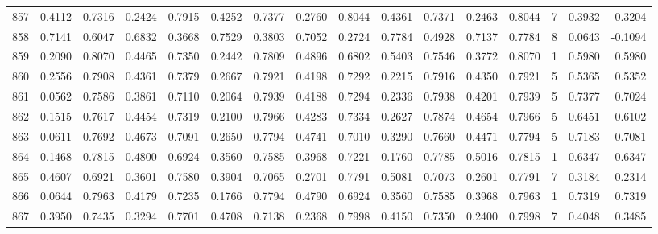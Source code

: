 \begin{tabular}{lrrrrrrrrrrrrrrr}
857 &      0.4112 &  0.7316 &  0.2424 &  0.7915 &  0.4252 &  0.7377 &  0.2760 &  0.8044 &  0.4361 &  0.7371 &   0.2463 &     0.8044 &      7 &                    0.3932 &                     0.3204 \\
858 &      0.7141 &  0.6047 &  0.6832 &  0.3668 &  0.7529 &  0.3803 &  0.7052 &  0.2724 &  0.7784 &  0.4928 &   0.7137 &     0.7784 &      8 &                    0.0643 &                    -0.1094 \\
859 &      0.2090 &  0.8070 &  0.4465 &  0.7350 &  0.2442 &  0.7809 &  0.4896 &  0.6802 &  0.5403 &  0.7546 &   0.3772 &     0.8070 &      1 &                    0.5980 &                     0.5980 \\
860 &      0.2556 &  0.7908 &  0.4361 &  0.7379 &  0.2667 &  0.7921 &  0.4198 &  0.7292 &  0.2215 &  0.7916 &   0.4350 &     0.7921 &      5 &                    0.5365 &                     0.5352 \\
861 &      0.0562 &  0.7586 &  0.3861 &  0.7110 &  0.2064 &  0.7939 &  0.4188 &  0.7294 &  0.2336 &  0.7938 &   0.4201 &     0.7939 &      5 &                    0.7377 &                     0.7024 \\
862 &      0.1515 &  0.7617 &  0.4454 &  0.7319 &  0.2100 &  0.7966 &  0.4283 &  0.7334 &  0.2627 &  0.7874 &   0.4654 &     0.7966 &      5 &                    0.6451 &                     0.6102 \\
863 &      0.0611 &  0.7692 &  0.4673 &  0.7091 &  0.2650 &  0.7794 &  0.4741 &  0.7010 &  0.3290 &  0.7660 &   0.4471 &     0.7794 &      5 &                    0.7183 &                     0.7081 \\
864 &      0.1468 &  0.7815 &  0.4800 &  0.6924 &  0.3560 &  0.7585 &  0.3968 &  0.7221 &  0.1760 &  0.7785 &   0.5016 &     0.7815 &      1 &                    0.6347 &                     0.6347 \\
865 &      0.4607 &  0.6921 &  0.3601 &  0.7580 &  0.3904 &  0.7065 &  0.2701 &  0.7791 &  0.5081 &  0.7073 &   0.2601 &     0.7791 &      7 &                    0.3184 &                     0.2314 \\
866 &      0.0644 &  0.7963 &  0.4179 &  0.7235 &  0.1766 &  0.7794 &  0.4790 &  0.6924 &  0.3560 &  0.7585 &   0.3968 &     0.7963 &      1 &                    0.7319 &                     0.7319 \\
867 &      0.3950 &  0.7435 &  0.3294 &  0.7701 &  0.4708 &  0.7138 &  0.2368 &  0.7998 &  0.4150 &  0.7350 &   0.2400 &     0.7998 &      7 &                    0.4048 &                     0.3485 \\

\end{tabular}
